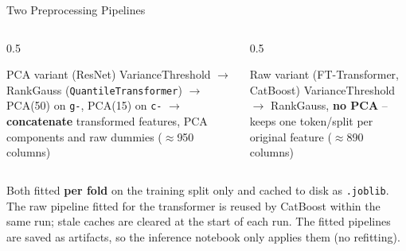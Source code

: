 \documentclass[9pt,aspectratio=169]{beamer}
\begin{document}
\begin{frame}{Two Preprocessing Pipelines}
  \begin{columns}[T]
    \begin{column}{0.5\textwidth}
      \begin{block}{PCA variant (ResNet)}
        VarianceThreshold $\to$ RankGauss (\texttt{QuantileTransformer}) $\to$ PCA(50) on \texttt{g-}, PCA(15) on \texttt{c-} $\to$ \textbf{concatenate} transformed features, PCA components and raw dummies ($\approx$950 columns)
      \end{block}
    \end{column}
    \begin{column}{0.5\textwidth}
      \begin{block}{Raw variant (FT-Transformer, CatBoost)}
        VarianceThreshold $\to$ RankGauss, \textbf{no PCA} -- keeps one token/split per original feature ($\approx$890 columns)
      \end{block}
    \end{column}
  \end{columns}
  \vspace{2mm}
  \small Both fitted \textbf{per fold} on the training split only and cached to disk as \texttt{.joblib}. The raw pipeline fitted for the transformer is reused by CatBoost within the same run; stale caches are cleared at the start of each run. The fitted pipelines are saved as artifacts, so the inference notebook only applies them (no refitting).
\end{frame}
\end{document}
